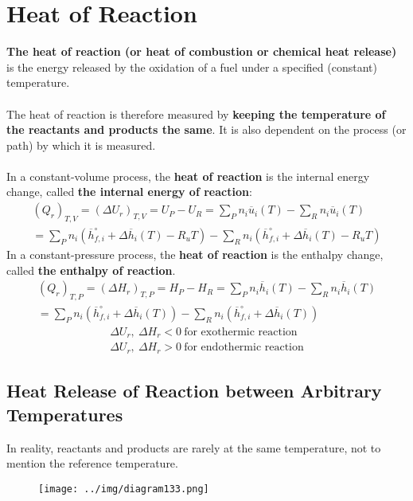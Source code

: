 \documentclass[class=report, crop=false, 12pt,a4paper]{standalone}
\numberwithin{equation}{section}
\begin{document}
\section{Heat of Reaction}
\textbf{The heat of reaction (or heat of combustion or chemical heat release)} is the energy released by the oxidation of a fuel under a specified (constant) temperature. \\\\
The heat of reaction is therefore measured by \textbf{keeping the temperature of the reactants and products the same}. It is also dependent on the process (or path) by which it is measured. \\\\
In a constant-volume process, the \textbf{heat of reaction} is the internal energy change, called \textbf{the internal energy of reaction}:
\begin{gather}
  (Q_r)_{T,V} = (\Delta U_r)_{T,V} = U_P - U_R = \sum_{P}n_i\overline{u}_i(T) - \sum_{R}n_i\overline{u}_i(T) \\[5pt]
  = \sum_{P}n_i\left(\overline{h}_{f,i}^\circ + \Delta\overline{h}_{i}(T) - R_uT\right) - \sum_{R}n_i\left(\overline{h}_{f,i}^\circ + \Delta\overline{h}_{i}(T) - R_uT\right)
\end{gather}
In a constant-pressure process, the \textbf{heat of reaction} is the enthalpy change, called \textbf{the enthalpy of reaction}.
\begin{gather}
  (Q_r)_{T,P} = (\Delta H_r)_{T,P} = H_P - H_R = \sum_{P}n_i\overline{h}_i(T) - \sum_{R}n_i\overline{h}_i(T) \\[5pt]
  = \sum_{P}n_i\left(\overline{h}_{f,i}^\circ + \Delta\overline{h}_i(T)\right) - \sum_{R}n_i\left(\overline{h}_{f,i}^\circ + \Delta\overline{h}_i(T)\right)
\end{gather}
\begin{gather*}
  \Delta U_r, \ \Delta H_r < 0 \ \text{for exothermic reaction} \\[5pt]
  \Delta U_r, \ \Delta H_r > 0 \ \text{for endothermic reaction}
\end{gather*}
\subsection{Heat Release of Reaction between Arbitrary Temperatures}
In reality, reactants and products are rarely at the same temperature, not to mention the reference temperature.
\begin{figure}[H]
  \centering
  \texttt{[image: ../img/diagram133.png]}
  \caption{}
\end{figure}
\end{document}
